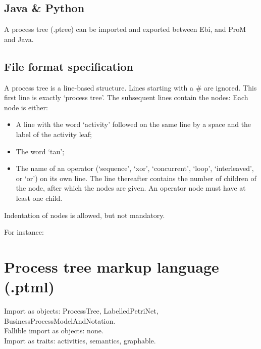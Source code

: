 {\subsection*{Java \& Python}
A process tree (.ptree) can be imported and exported between Ebi, and ProM and Java.
\subsection*{File format specification}A process tree is a line-based structure. Lines starting with a \# are ignored.
    This first line is exactly `process tree'.
    The subsequent lines contain the nodes:
    Each node is either:
    \begin{itemize}
        \item A line with the word `activity' followed on the same line by a space and the label of the activity leaf;
        \item The word `tau';
        \item The name of an operator (`sequence', `xor', `concurrent', `loop', `interleaved', or `or') on its own line.
        The line thereafter contains the number of children of the node, after which the nodes are given.
        An operator node must have at least one child.
    \end{itemize}
    Indentation of nodes is allowed, but not mandatory.
    
    For instance:
    
\clearpage
\section{Process tree markup language (.ptml)}
\label{filehandler:process tree markup language}
Import as objects: ProcessTree, LabelledPetriNet, BusinessProcessModelAndNotation.
\\Fallible import as objects: none.
\\Import as traits: activities, semantics, graphable.
}
